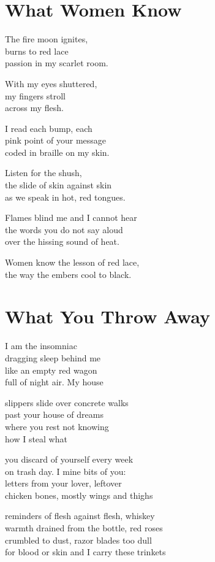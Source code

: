 \documentclass[twoside,10pt]{book}
\begin{document}
\clearpage
\section{What Women Know}

The fire moon ignites,\\
burns to red lace\\
passion in my scarlet room.

With my eyes shuttered,\\
my fingers stroll\\
across my flesh.

I read each bump, each\\
pink point of your message\\
coded in braille on my skin.

Listen for the shush,\\
the slide of skin against skin\\
as we speak in hot, red tongues.

Flames blind me and I cannot hear\\
the words you do not say aloud\\
over the hissing sound of heat.

Women know the lesson of red lace,\\
the way the embers cool to black.


\clearpage
\section{What You Throw Away}

I am the insomniac\\
dragging sleep behind me\\
like an empty red wagon\\
full of night air. My house

slippers slide over concrete walks\\
past your house of dreams\\
where you rest not knowing\\
how I steal what

you discard of yourself every week\\
on trash day. I mine bits of you:\\
letters from your lover, leftover\\
chicken bones, mostly wings and thighs

reminders of flesh against flesh, whiskey\\
warmth drained from the bottle, red roses\\
crumbled to dust, razor blades too dull\\
for blood or skin and I carry these trinkets
\end{document}
